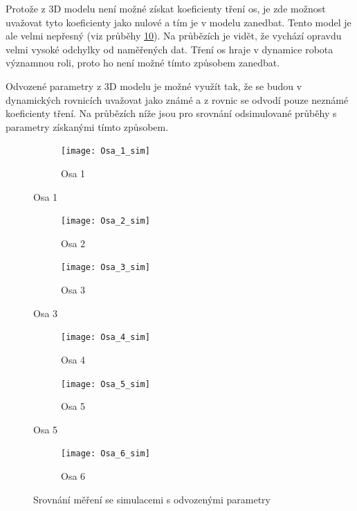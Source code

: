Protože z 3D modelu není možné získat koeficienty tření os, je zde možnost uvažovat tyto koeficienty jako nulové a tím je v modelu zanedbat. Tento model je ale velmi nepřesný (viz průběhy \ref{osy_sim_pic}). Na průbězích je vidět, že vychází opravdu velmi vysoké odchylky od naměřených dat. Tření os hraje v dynamice robota významnou roli, proto ho není možné tímto způsobem zanedbat.

Odvozené parametry z 3D modelu je možné využít tak, že se budou v dynamických rovnicích uvažovat jako známé a z rovnic se odvodí pouze neznámé koeficienty tření. Na průbězích níže jsou pro srovnání odsimulované průběhy s parametry získanými tímto způsobem. 

\begin{figure}[h]
    \centering
    \begin{subfigure}[b]{1\textwidth}
        \texttt{[image: Osa\_1\_sim]}
        \caption{Osa 1}
        \label{osa_1_sim_pic}
        \end{subfigure}
\end{figure}
\begin{figure}\ContinuedFloat    
    \begin{subfigure}[b]{1\textwidth}
        \texttt{[image: Osa\_2\_sim]}
        \caption{Osa 2}
        \label{osa_2_sim_pic}
    \end{subfigure}
    \begin{subfigure}[b]{1\textwidth}
        \texttt{[image: Osa\_3\_sim]}
        \caption{Osa 3}
        \label{osa_3_sim_pic}
    \end{subfigure}
\end{figure}
\begin{figure}\ContinuedFloat
    \begin{subfigure}[b]{1\textwidth}
        \texttt{[image: Osa\_4\_sim]}
        \caption{Osa 4}
        \label{osa_4_sim_pic}
    \end{subfigure}
    \begin{subfigure}[b]{1\textwidth}
        \texttt{[image: Osa\_5\_sim]}
        \caption{Osa 5}
        \label{osa_5_sim_pic}
    \end{subfigure}
\end{figure}

\clearpage

\begin{figure}\ContinuedFloat
    \begin{subfigure}[b]{1\textwidth}
        \texttt{[image: Osa\_6\_sim]}
        \caption{Osa 6}
        \label{osa_6_sim_pic}
    \end{subfigure}
    \caption{Srovnání měření se simulacemi s odvozenými parametry}\label{osy_sim_pic}
\end{figure}

